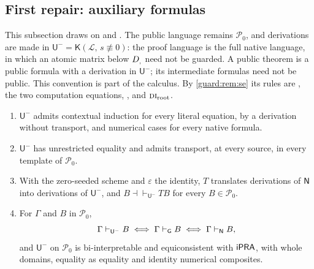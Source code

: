 \subsection{First repair: auxiliary formulas}
\label{guard:sec:aux}

This subsection draws on  and
.  The public language remains
$\mathcal P_0$, and derivations are made in
$\mathsf U^{-}=\mathsf K(\mathcal L,\,s\not\equiv 0)$: the proof language is
the full native language, in which an atomic matrix below $D_{,}$ need not
be guarded.  A public theorem is a public formula with a derivation in
$\mathsf U^{-}$; its intermediate formulas need not be public.  This
convention is part of the calculus.  By \cref{guard:rem:se} its rules are
, the two computation equations, , 
and $\rulename{DI}_{\mathrm{root}}$.

\begin{theorem}
\label{guard:thm:aux}
\begin{enumerate}[label=\textup{(\roman*)}]
\item $\mathsf U^{-}$ admits contextual induction for every literal
 equation, by a derivation without transport, and numerical cases for every
 native formula.
\item $\mathsf U^{-}$ has unrestricted equality and admits transport, at
 every source, in every template of $\mathcal P_0$.
\item With the zero-seeded scheme and $\varepsilon$ the identity, $T$
 translates derivations of $\mathsf{N}$ into derivations of $\mathsf U^{-}$, and
 $B\dashv\vdash_{\mathsf U^{-}}TB$ for every $B\in\mathcal P_0$.
\item For $\Gamma$ and $B$ in $\mathcal P_0$,
 \[
  \Gamma\vdash_{\mathsf U^{-}}B
  \iff\Gamma\vdash_{\mathsf G}B
  \iff\Gamma\vdash_{\mathsf{N}}B ,
 \]
 and $\mathsf U^{-}$ on $\mathcal P_0$ is bi-interpretable and
 equiconsistent with $\mathsf{iPRA}$, with whole domains, equality as equality and
 identity numerical composites.
\end{enumerate}
\end{theorem}

